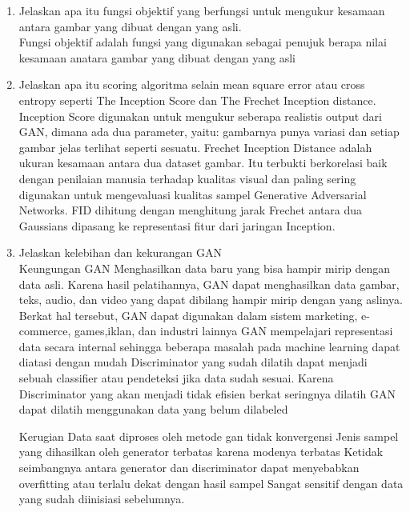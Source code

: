 \begin{enumerate}
\item Jelaskan apa itu fungsi objektif yang berfungsi untuk mengukur kesamaan antara gambar yang dibuat dengan yang asli.
	\hfill\\
	Fungsi objektif adalah fungsi yang digunakan sebagai penujuk berapa nilai kesamaan anatara gambar yang dibuat dengan yang asli
	
\item Jelaskan apa itu scoring algoritma selain mean square error atau cross entropy seperti The Inception Score dan The Frechet Inception distance.
	\hfill\\
	Inception Score digunakan untuk mengukur seberapa realistis output dari GAN, dimana ada dua parameter, yaitu: gambarnya punya variasi dan setiap gambar jelas terlihat seperti sesuatu. Frechet Inception Distance adalah ukuran kesamaan antara dua dataset gambar. Itu terbukti berkorelasi baik dengan penilaian manusia terhadap kualitas visual dan paling sering digunakan untuk mengevaluasi kualitas sampel Generative Adversarial Networks. FID dihitung dengan menghitung jarak Frechet antara dua Gaussians dipasang ke representasi fitur dari jaringan Inception.
	
\item  Jelaskan kelebihan dan kekurangan GAN
	\hfill\\
	Keungungan
GAN Menghasilkan data baru yang bisa hampir mirip dengan data asli. Karena hasil pelatihannya, GAN dapat menghasilkan data gambar, teks, audio, dan video yang dapat dibilang hampir mirip dengan yang aslinya. Berkat hal tersebut, GAN dapat digunakan dalam sistem marketing, e-commerce, games,iklan, dan industri lainnya
GAN mempelajari representasi data secara internal sehingga beberapa masalah pada machine learning dapat diatasi dengan mudah
Discriminator yang sudah dilatih dapat menjadi sebuah classifier atau pendeteksi jika data sudah sesuai. Karena Discriminator yang akan menjadi tidak efisien berkat seringnya dilatih
GAN dapat dilatih menggunakan data yang belum dilabeled

Kerugian
Data saat diproses oleh metode gan tidak konvergensi
Jenis sampel yang dihasilkan oleh generator terbatas karena modenya terbatas
Ketidak seimbangnya antara generator dan discriminator dapat menyebabkan overfitting atau terlalu dekat dengan hasil sampel
Sangat sensitif dengan data yang sudah diinisiasi sebelumnya.
	
\end{enumerate}




